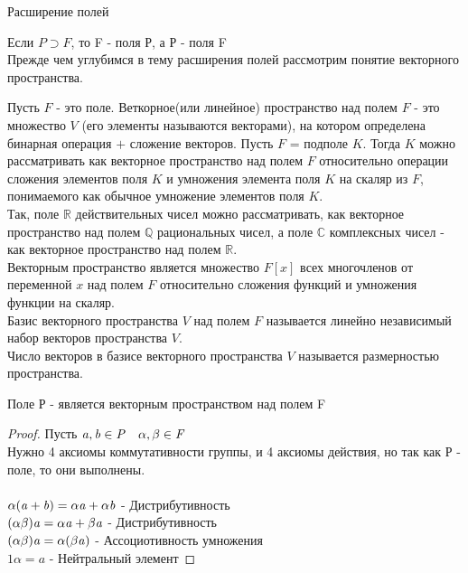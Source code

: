 \begin{title}
	Расширение полей
\end{title}

Если $P \supset F$, то F -  поля Р, а Р -  поля F\\

Прежде чем углубимся в тему расширения полей рассмотрим понятие векторного пространства.

Пусть $F$ - это поле. Веткорное(или линейное) пространство над полем $F$ - это множество $V$ 
(его элементы называются векторами), на котором определена бинарная операция $+$ сложение 
векторов.
Пусть $F$ = подполе $K$. Тогда $K$ можно рассматривать как векторное пространство над
полем $F$ относительно операции сложения элементов поля $K$ и умножения элемента 
поля $K$ на скаляр из $F$, понимаемого как обычное умножение элементов поля $K$.\\
Так, поле $\mathbb{R}$ действительных чисел можно рассматривать, как векторное 
пространство над полем $\mathbb{Q}$ рациональных чисел, а поле $\mathbb{C}$
комплексных чисел - как векторное пространство над полем $\mathbb{R}$.\\

Векторным пространство является множество $F[x]$ всех многочленов от переменной
$x$ над полем $F$ относительно сложения функций и умножения функции на скаляр.\\
Базис векторного пространства $V$ над полем $F$ называется линейно независимый 
набор векторов пространства $V$.\\
Число векторов в базисе векторного пространства $V$ называется размерностью 
пространства.\\

\begin{defin}
	Поле Р - является векторным пространством над полем F
\end{defin}

\begin{proof}
	Пусть $\mathit{a,b \in P \quad \alpha,\beta\in F}$ \\
	Нужно 4 аксиомы коммутативности группы, и 4 аксиомы действия, но так как Р -
	поле, то они выполнены. \\
	 \\
	$\mathit{\alpha(a+b)=\alpha a + \alpha b}$ - Дистрибутивность \\
	$\mathit{(\alpha \beta)a=\alpha a + \beta a}$ - Дистрибутивность \\
	$\mathit{(\alpha \beta)a=\alpha(\beta a)}$ - Ассоциотивность умножения \\
	$1\alpha=a$ - Нейтральный элемент
\end{proof}

